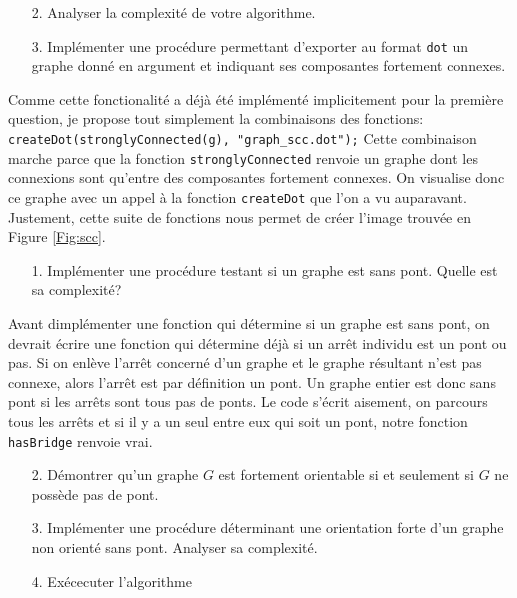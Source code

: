 \documentclass[10pt]{article} %
\begin{document}
\begin{itemize}
    \item [2.] Analyser la complexité de votre algorithme.
\end{itemize}

\begin{itemize}
    \item [3.] Implémenter une procédure permettant d'exporter au format \texttt{dot} un graphe donné en argument et indiquant ses composantes fortement connexes.
\end{itemize}

Comme cette fonctionalité a déjà été implémenté implicitement pour la première question, je propose tout simplement la combinaisons des fonctions:
\texttt{createDot(stronglyConnected(g), "graph\_scc.dot");} Cette combinaison marche parce que la fonction \texttt{stronglyConnected} renvoie un graphe dont les connexions sont
qu'entre des composantes fortement connexes. On visualise donc ce graphe avec un appel à la fonction \texttt{createDot} que l'on a vu auparavant. Justement, cette suite de fonctions nous permet
de créer l'image trouvée en Figure \ref{Fig:scc}.


\vspace{.5cm}
\noindent {} 

\begin{itemize}
    \item [1.] Implémenter une procédure testant si un graphe est sans pont. Quelle est sa complexité?
\end{itemize}

Avant dimplémenter une fonction qui détermine si un graphe est sans pont, on devrait écrire une fonction qui détermine déjà si un arrêt individu est
un pont ou pas. Si on enlève l'arrêt concerné d'un graphe et le graphe résultant n'est pas connexe, alors l'arrêt est par définition un pont.  Un graphe entier est donc
sans pont si les arrêts sont tous pas de ponts. Le code s'écrit aisement, on parcours tous les arrêts et si il y a un seul entre eux qui soit un pont,
notre fonction \texttt{hasBridge} renvoie vrai.

\begin{itemize}
    \item [2.] Démontrer qu'un graphe $G$ est fortement orientable si et seulement si $G$ ne possède pas de pont.
\end{itemize}

\begin{itemize}
    \item [3.] Implémenter une procédure déterminant une orientation forte d'un graphe non orienté sans pont. Analyser sa complexité.
\end{itemize}

\begin{itemize}
    \item[4.] Exécecuter l'algorithme
\end{itemize}



\end{document}
